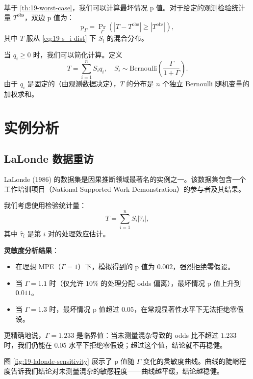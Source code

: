 基于 \cref{th:19-worst-case}，我们可以计算最坏情况 p 值。对于给定的观测检验统计量 $T^{\mathrm{obs}}$，双边 p 值为：
\[
\text{p}_{\Gamma} = \Pr_{\Gamma}\left(|T - T^{\mathrm{obs}}| \geq |T^{\mathrm{obs}}|\right),
\label{eq:19-worst-p-value}
\]
其中 $T$ 服从 \cref{eq:19-s_i-dist} 下 $S_i$ 的混合分布。

当 $q_i \geq 0$ 时，我们可以简化计算。定义
\[
T = \sum_{i=1}^n S_i q_i, \quad S_i \sim \text{Bernoulli}\left(\frac{\Gamma}{1+\Gamma}\right).
\]
由于 $q_i$ 是固定的（由观测数据决定），$T$ 的分布是 $n$ 个独立 Bernoulli 随机变量的加权求和。

\section{实例分析}\label{sec:19-examples}

\subsection{LaLonde 数据重访}\label{sec:19-lalonde}

LaLonde (1986) 的数据集是因果推断领域最著名的实例之一。该数据集包含一个工作培训项目（National Supported Work Demonstration）的参与者及其结果。

我们考虑使用检验统计量：
\[
T = \sum_{i=1}^n S_i |\hat{\tau}_i|,
\label{eq:19-lalonde-stat}
\]
其中 $\hat{\tau}_i$ 是第 $i$ 对的处理效应估计。

\textbf{灵敏度分析结果}：

\begin{itemize}
  \item 在理想 MPE（$\Gamma = 1$）下，模拟得到的 p 值为 $0.002$，强烈拒绝零假设。
  \item 当 $\Gamma = 1.1$ 时（仅允许 $10\%$ 的处理分配 odds 偏离），最坏情况 p 值上升到 $0.011$。
  \item 当 $\Gamma = 1.3$ 时，最坏情况 p 值超过 $0.05$，在常规显著性水平下无法拒绝零假设。
\end{itemize}

更精确地说，$\Gamma = 1.233$ 是临界值：当未测量混杂导致的 odds 比不超过 $1.233$ 时，我们仍能在 $0.05$ 水平下拒绝零假设；超过这个值，结论就不再稳健。

\begin{Example}\label{ex:19-lalonde-sensitivity}
图 \ref{fig:19-lalonde-sensitivity} 展示了 p 值随 $\Gamma$ 变化的灵敏度曲线。曲线的陡峭程度告诉我们结论对未测量混杂的敏感程度——曲线越平缓，结论越稳健。
\end{Example}

